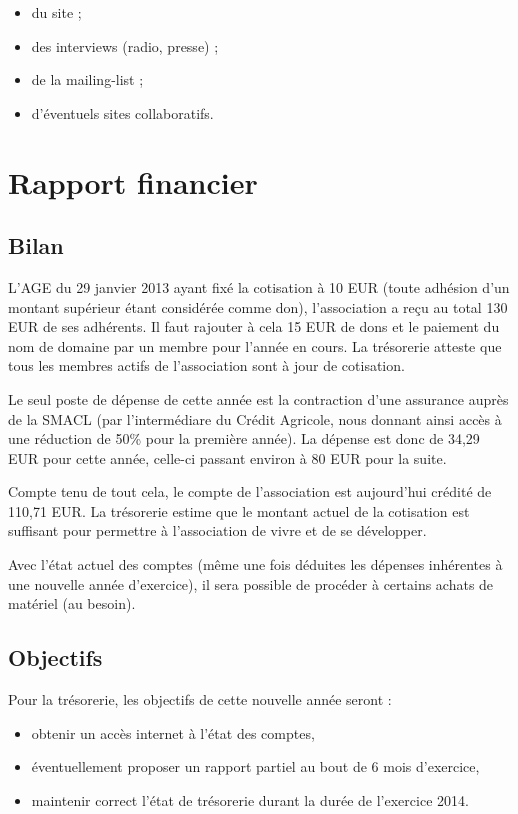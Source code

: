 \documentclass[11pt]{article}
\begin{document}
\begin{itemize}
    \item du site ;
    \item des interviews (radio, presse) ;
    \item de la mailing-list ;
    \item d'éventuels sites collaboratifs.
\end{itemize}

\section{Rapport financier}

\subsection{Bilan}

L'AGE du 29 janvier 2013 ayant fixé la cotisation à 10 EUR (toute adhésion d'un montant supérieur étant considérée comme
don), l'association a reçu au total 130 EUR de ses adhérents. Il faut rajouter à cela 15 EUR de dons et le paiement du nom de
domaine par un membre pour l'année en cours. La trésorerie atteste que tous les membres actifs de l'association sont à
jour de cotisation.

Le seul poste de dépense de cette année est la contraction d'une assurance auprès de la SMACL (par l'intermédiare du
Crédit Agricole, nous donnant ainsi accès à une réduction de 50\% pour la première année).
La dépense est donc de 34,29 EUR pour cette année, celle-ci passant environ à 80 EUR pour la suite.

Compte tenu de tout cela, le compte de l'association est aujourd'hui crédité de 110,71 EUR. La trésorerie estime que le
montant actuel de la cotisation est suffisant pour permettre à l'association de vivre et de se développer.

Avec l'état actuel des comptes (même une fois déduites les dépenses inhérentes à une nouvelle année d'exercice), il sera
possible de procéder à certains achats de matériel (au besoin).

\subsection{Objectifs}

Pour la trésorerie, les objectifs de cette nouvelle année seront :

\begin{itemize}
    \item obtenir un accès internet à l'état des comptes,
    \item éventuellement proposer un rapport partiel au bout de 6 mois d'exercice,
    \item maintenir correct l'état de trésorerie durant la durée de l'exercice 2014.
\end{itemize}
\end{document}
